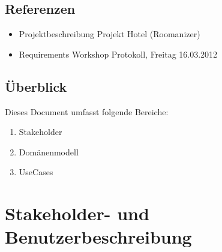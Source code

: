 \documentclass[10pt,a4paper,titlepage]{article}
\begin{document}
\subsection{Referenzen}
\begin{itemize}
	\item Projektbeschreibung Projekt Hotel (Roomanizer) 
	\item Requirements Workshop Protokoll, Freitag 16.03.2012
\end{itemize}

\subsection{Überblick}
Dieses Document umfasst folgende Bereiche:
\begin{enumerate}
	\item Stakeholder
	\item Domänenmodell
	\item UseCases 
\end{enumerate}

\newpage

\section{Stakeholder- und Benutzerbeschreibung}
\end{document}
